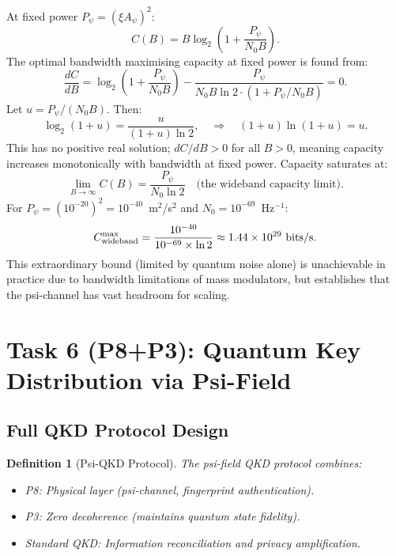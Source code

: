 \documentclass[aps,prd,twocolumn,superscriptaddress,nofootinbib]{revtex4-2}
\newtheorem{definition}{Definition}
\begin{document}
At fixed power $P_\psi = (\xi A_\psi)^2$:
\begin{equation}
C(B) = B\log_2\!\left(1 + \frac{P_\psi}{N_0 B}\right).
\end{equation}
The optimal bandwidth maximising capacity at fixed power is found from:
\begin{equation}
\frac{dC}{dB} = \log_2\!\left(1 + \frac{P_\psi}{N_0 B}\right)
- \frac{P_\psi}{N_0 B \ln 2 \cdot (1 + P_\psi / N_0 B)} = 0.
\end{equation}
Let $u = P_\psi/(N_0 B)$. Then:
\begin{equation}
\log_2(1+u) = \frac{u}{(1+u)\ln 2}, \quad \Rightarrow \quad
(1+u)\ln(1+u) = u.
\end{equation}
This has no positive real solution; $dC/dB > 0$ for all $B > 0$,
meaning capacity increases monotonically with bandwidth at fixed power.
Capacity saturates at:
\begin{equation}
\lim_{B\to\infty} C(B) = \frac{P_\psi}{N_0 \ln 2}
\quad \text{(the wideband capacity limit)}.
\label{eq:wideband}
\end{equation}
For $P_\psi = (10^{-20})^2 = 10^{-40}$~m$^2$/s$^2$ and $N_0 = 10^{-69}$~Hz$^{-1}$:
\begin{equation}
C_{\rm wideband}^{\rm max} = \frac{10^{-40}}{10^{-69} \times \ln 2}
\approx 1.44\times10^{29}~\text{bits/s}.
\label{eq:C-wideband}
\end{equation}
This extraordinary bound (limited by quantum noise alone) is unachievable
in practice due to bandwidth limitations of mass modulators,
but establishes that the psi-channel has vast headroom for scaling.

\section{Task 6 (P8+P3): Quantum Key Distribution via Psi-Field}
\label{sec:qkd-p3}

\subsection{Full QKD Protocol Design}

\begin{definition}[Psi-QKD Protocol]
The psi-field QKD protocol combines:
\begin{itemize}
\item P8: Physical layer (psi-channel, fingerprint authentication).
\item P3: Zero decoherence (maintains quantum state fidelity).
\item Standard QKD: Information reconciliation and privacy amplification.
\end{itemize}
\end{definition}
\end{document}
